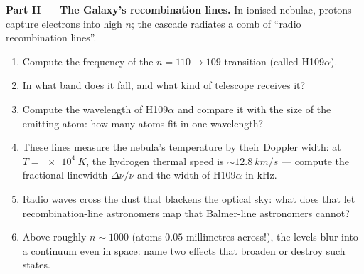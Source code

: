 \begin{problem}
\medskip\noindent\textbf{Part II --- The Galaxy's recombination
lines.}
In ionised nebulae, protons capture electrons into high $n$; the
cascade radiates a comb of ``radio recombination lines''.
\begin{enumerate}[resume]
  \item Compute the frequency of the $n = 110 \to 109$ transition
        (called H109$\alpha$).
  \item In what band does it fall, and what kind of telescope
        receives it?
  \item Compute the wavelength of H109$\alpha$ and compare it with
        the size of the emitting atom: how many atoms fit in one
        wavelength?
  \item These lines measure the nebula's temperature by their
        Doppler width: at $T = \qty{e4}{K}$, the hydrogen thermal
        speed is $\sim\qty{12.8}{km/s}$ --- compute the fractional
        linewidth $\Delta\nu/\nu$ and the width of H109$\alpha$ in
        kHz.
  \item Radio waves cross the dust that blackens the optical sky:
        what does that let recombination-line astronomers map that
        Balmer-line astronomers cannot?
  \item Above roughly $n \sim 1000$ (atoms $0.05$ millimetres
        across!), the levels blur into a continuum even in space:
        name two effects that broaden or destroy such states.
\end{enumerate}


\end{problem}
